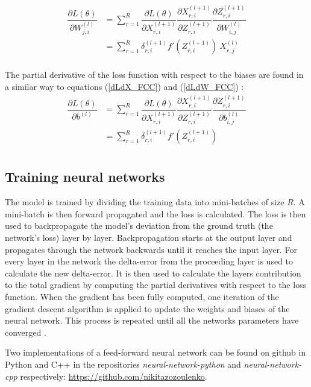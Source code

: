 \documentclass[a4paper, twoside]{article}
\newcommand*{\pd}[2]{\ensuremath{\dfrac{\partial #1}{\partial #2}}}
\begin{document}
\begin{equation}\label{dLdW_FCC}
\begin{split}
\pd{L(\theta)}{W^{(l)}_{j,i}} 
	& = \sum^{R}_{r=1} \pd{L(\theta)}{X^{(l+1)}_{r,i}} \pd{X^{(l+1)}_{r,i}}{Z^{(l+1)}_{r,i}} \pd{Z^{(l+1)}_{r,i}}{W^{(l)}_{i,j}} \\
	& = \sum^{R}_{r=1} \delta^{(l+1)}_{r,i} f'(Z^{(l+1)}_{r,i}) \ X^{(l)}_{r,j}\\
\end{split}
\end{equation}

The partial derivative of the loss function with respect to the biases are found in a similar way to equations (\ref{dLdX_FCC}) and (\ref{dLdW_FCC}) \cite{cs231n} \cite{wikiStanford}:
\begin{equation}\label{dLdb_FCC}
\begin{split}
\pd{L(\theta)}{b^{(l)}} 
	& = \sum^{R}_{r=1} \pd{L(\theta)}{X^{(l+1)}_{r,i}} \pd{X^{(l+1)}_{r,i}}{Z^{(l+1)}_{r,i}} \pd{Z^{(l+1)}_{r,i}}{b^{(l)}_{i,j}} \\
	& = \sum^{R}_{r=1} \delta^{(l+1)}_{r,i} f'(Z^{(l+1)}_{r,i}) \\
\end{split}
\end{equation}

\subsection{Training neural networks}
The model is trained by dividing the training data into mini-batches of size $R$. A mini-batch is then forward propagated and the loss is calculated. The loss is then used to backpropagate the model's deviation from the ground truth (the network's loss) layer by layer. Backpropagation starts at the output layer and propagates through the network backwards until it reaches the input layer. For every layer in the network the delta-error from the proceeding layer is used to calculate the new delta-error. It is then used to calculate the layers contribution to the total gradient by computing the partial derivatives with respect to the loss function. When the gradient has been fully computed, one iteration of the gradient descent algorithm is applied to update the weights and biases of the neural network. This process is repeated until all the networks parameters have converged \cite{cs231n}.

Two implementations of a feed-forward neural network can be found on github in Python and C++ in the repositories \textit{neural-network-python} and \textit{neural-network-cpp} respectively: \url{https://github.com/nikitazozoulenko}.
\end{document}
